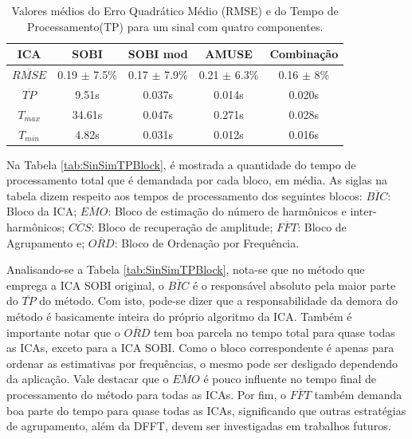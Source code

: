 \documentclass[a4paper,12pt]{monografia}
\theoremstyle{plain}
\theoremstyle{definition}
\theoremstyle{remark}
\begin{document}
\begin{table}[h]
    \begin{center}
    \caption{Valores médios do Erro Quadrático Médio (RMSE) e do Tempo de Processamento(TP) para um sinal com quatro componentes.}
        \begin{tabular}{c|c c c c}
        \hline
        \textbf{ICA} & \textbf{SOBI} & \textbf{SOBI mod} & \textbf{AMUSE} & \textbf{Combinação}\\ \hline
        $\overline{RMSE}$   & 0.19 $\pm$ 7.5\% & 0.17 $\pm$ 7.9\% & 0.21 $\pm$ 6.3\% & 0.16 $\pm$ 8\%\\ \hline
        $\overline{TP}$    & 9.51s   & 0.037s   & 0.014s   & 0.020s  \\ \hline
        $T_{max}$             & 34.61s  & 0.047s   & 0.271s   & 0.028s  \\ \hline
        $T_{min}$             & 4.82s   & 0.031s   & 0.012s   & 0.016s  \\ \hline
        \end{tabular}
        \label{tab:SinSimRMSETP}
    \end{center}
    
\end{table}

Na Tabela \ref{tab:SinSimTPBlock}, é mostrada a quantidade do tempo de processamento total que é demandada por cada bloco, em média. As siglas na tabela dizem respeito aos tempos de processamento dos seguintes blocos: $\overline{BIC}$: Bloco da ICA; $\overline{EMO}$: Bloco de estimação do número de harmônicos e inter-harmônicos; $\overline{CCS}$: Bloco de recuperação de amplitude; $\overline{FFT}$: Bloco de Agrupamento e; $\overline{ORD}$: Bloco de Ordenação por Frequência. 

Analisando-se a Tabela \ref{tab:SinSimTPBlock}, nota-se que no método que emprega a ICA SOBI original, o $\overline{BIC}$ é o responsável absoluto pela maior parte do $\overline{TP}$ do método. Com isto, pode-se dizer que a responsabilidade da demora do método é basicamente inteira do próprio algoritmo da ICA. Também é importante notar que o $\overline{ORD}$ tem boa parcela no tempo total para quase todas as ICAs, exceto para a ICA SOBI. Como o bloco correspondente é apenas para ordenar as estimativas por frequências, o mesmo pode ser desligado dependendo da aplicação. Vale destacar que o $\overline{EMO}$ é pouco influente no tempo final de processamento do método para todas as ICAs. Por fim, o $\overline{FFT}$ também demanda boa parte do tempo para quase todas as ICAs, significando que outras estratégias de agrupamento, além da DFFT, devem ser investigadas em trabalhos futuros.  
\end{document}
